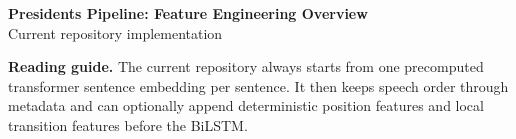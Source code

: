 \documentclass[11pt]{article}
\begin{document}
\begin{center}
    {\LARGE\bfseries Presidents Pipeline: Feature Engineering Overview}\\[0.4em]
    {\large Current repository implementation}
\end{center}

\vspace{0.8em}

\noindent
\colorbox{accentsoft}{%
    \parbox{\dimexpr\textwidth-2\fboxsep\relax}{%
        \textbf{Reading guide.}
        The current repository always starts from one precomputed transformer sentence embedding per sentence.
        It then keeps speech order through metadata and can optionally append deterministic position features
        and local transition features before the BiLSTM.
    }%
}

\vspace{1em}

\small
\renewcommand{\arraystretch}{1.35}
\end{document}
